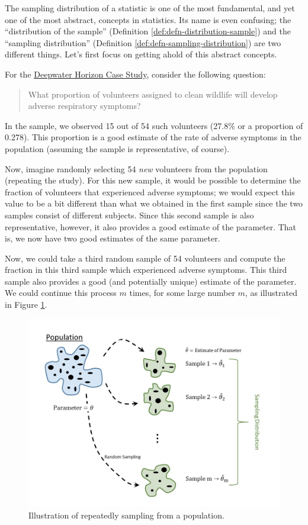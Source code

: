 \documentclass[]{book}
\theoremstyle{plain}
\theoremstyle{mydefn}
\theoremstyle{myexmpl}
\theoremstyle{remark}
\begin{document}
The sampling distribution of a statistic is one of the most fundamental,
and yet one of the most abstract, concepts in statistics. Its name is
even confusing; the ``distribution of the sample'' (Definition
\ref{def:defn-distribution-sample}) and the ``sampling distribution''
(Definition \ref{def:defn-sampling-distribution}) are two different
things. Let's first focus on getting ahold of this abstract concepts.

For the \protect\hyperlink{DeepwaterCase}{Deepwater Horizon Case Study},
consider the following question:

\begin{quote}
What proportion of volunteers assigned to clean wildlife will develop
adverse respiratory symptoms?
\end{quote}

In the sample, we observed 15 out of 54 such volunteers (27.8\% or a
proportion of 0.278). This proportion is a good estimate of the rate of
adverse symptoms in the population (assuming the sample is
representative, of course).

Now, imagine randomly selecting 54 \emph{new} volunteers from the
population (repeating the study). For this new sample, it would be
possible to determine the fraction of volunteers that experienced
adverse symptoms; we would expect this value to be a bit different than
what we obtained in the first sample since the two samples consist of
different subjects. Since this second sample is also representative,
however, it also provides a good estimate of the parameter. That is, we
now have two good estimates of the same parameter.

Now, we could take a third random sample of 54 volunteers and compute
the fraction in this third sample which experienced adverse symptoms.
This third sample also provides a good (and potentially unique) estimate
of the parameter. We could continue this process \(m\) times, for some
large number \(m\), as illustrated in Figure
\ref{fig:samplingdistns-sampling-distribution}.

\begin{figure}

{\centering \includegraphics[width=0.8\linewidth]{./images/SamplingDistns-Sampling-Distribution} 

}

\caption{Illustration of repeatedly sampling from a population.}\label{fig:samplingdistns-sampling-distribution}
\end{figure}
\end{document}
